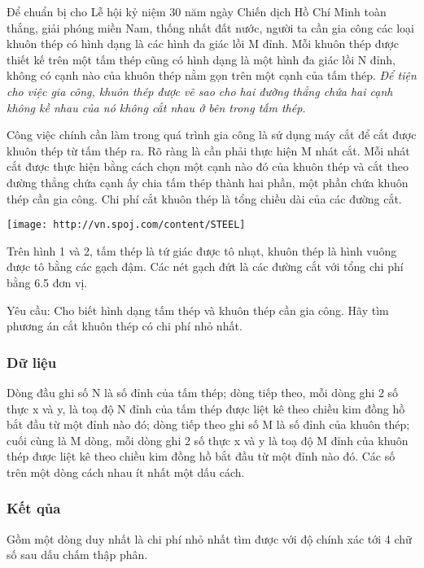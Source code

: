 



   Để chuẩn bị cho Lễ hội kỷ niệm 30 năm ngày Chiến dịch Hồ Chí Minh toàn thắng, giải phóng miền Nam, thống nhất đất nước, người ta cần gia   công các loại khuôn thép có hình dạng là các hình đa giác lồi M đỉnh. Mỗi khuôn thép được thiết kế trên một tấm thép cũng có hình dạng là một hình đa   giác lồi N đỉnh, không có cạnh nào của khuôn thép nằm gọn trên một cạnh của tấm thép.   \emph{    Để tiện cho việc gia công, khuôn thép được vẽ sao cho hai   đường thẳng chứa hai cạnh không kề nhau của nó không cắt nhau ở bên trong tấm thép.   }

   Công việc chính cần làm trong quá trình gia công là sử dụng máy cắt để cắt được khuôn thép từ tấm thép ra. Rõ ràng là cần phải thực hiện M nhát   cắt. Mỗi nhát cắt được thực hiện bằng cách chọn một cạnh nào đó của khuôn thép và cắt theo đường thẳng chứa cạnh ấy chia tấm thép thành hai phần,   một phần chứa khuôn thép cần gia công. Chi phí cắt khuôn thép là tổng chiều dài của các đường cắt.  


\texttt{[image: http://vn.spoj.com/content/STEEL]}

   Trên hình 1 và 2, tấm thép là tứ giác được tô nhạt, khuôn thép là hình vuông được tô bằng các gạch đậm. Các nét gạch đứt là các đường cắt với   tổng chi phí bằng 6.5 đơn vị.  

   Yêu cầu: Cho biết hình dạng tấm thép và khuôn thép cần gia công. Hãy tìm phương án cắt khuôn thép có chi phí nhỏ nhất.  

\subsubsection{   Dữ liệu  }

   Dòng đầu ghi số N là số đỉnh của tấm thép; dòng tiếp theo, mỗi dòng ghi 2 số thực x và y, là toạ độ N đỉnh của tấm thép được liệt kê theo chiều   kim đồng hồ bắt đầu từ một đỉnh nào đó; dòng tiếp theo ghi số M là số đỉnh của khuôn thép; cuối cùng là M dòng, mỗi dòng ghi 2 số thực x và y là toạ   độ M đỉnh của khuôn thép được liệt kê theo chiều kim đồng hồ bắt đầu từ một đỉnh nào đó. Các số trên một dòng cách nhau ít nhất một dấu cách.  

\subsubsection{   Kết qủa  }

   Gồm một dòng duy nhất là chi phí nhỏ nhất tìm được với độ chính xác tới 4 chữ số sau dấu chấm thập phân.  


